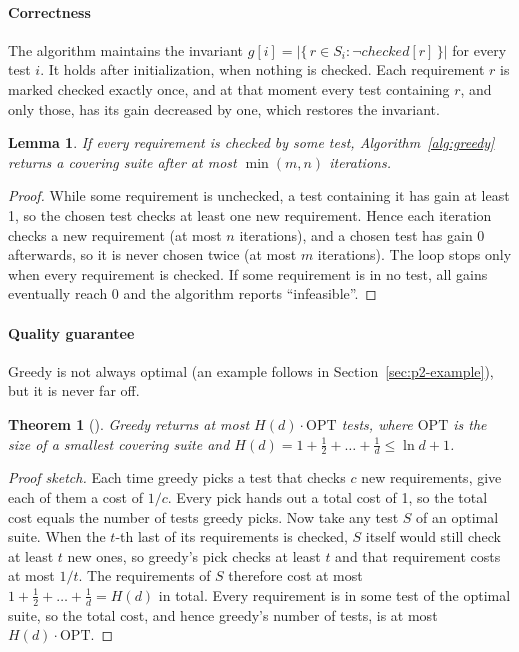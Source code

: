 \documentclass[conference]{IEEEtran}
\newtheorem{theorem}{Theorem}
\newtheorem{lemma}{Lemma}
\theoremstyle{definition}
\theoremstyle{remark}
\begin{document}
\paragraph*{Correctness}
The algorithm maintains the invariant
$g[i] = |\{\, r \in S_i : \neg\mathit{checked}[r] \,\}|$ for every test $i$.
It holds after initialization, when nothing is checked. Each requirement $r$
is marked checked exactly once, and at that moment every test containing $r$,
and only those, has its gain decreased by one, which restores the invariant.

\begin{lemma}\label{lem:greedy-valid}
If every requirement is checked by some test, Algorithm~\ref{alg:greedy}
returns a covering suite after at most $\min(m, n)$ iterations.
\end{lemma}
\begin{proof}
While some requirement is unchecked, a test containing it has gain at least
1, so the chosen test checks at least one new requirement. Hence each
iteration checks a new requirement (at most $n$ iterations), and a chosen test
has gain 0 afterwards, so it is never chosen twice (at most $m$ iterations).
The loop stops only when every requirement is checked. If some requirement is
in no test, all gains eventually reach 0 and the algorithm reports
``infeasible''.
\end{proof}

\paragraph*{Quality guarantee}
Greedy is not always optimal (an example follows in
Section~\ref{sec:p2-example}), but it is never far off.

\begin{theorem}[\cite{chvatal1979}]\label{thm:approx}
Greedy returns at most $H(d)\cdot\mathrm{OPT}$ tests, where $\mathrm{OPT}$ is
the size of a smallest covering suite and
$H(d) = 1 + \tfrac12 + \dots + \tfrac1d \le \ln d + 1$.
\end{theorem}
\begin{proof}[Proof sketch]
Each time greedy picks a test that checks $c$ new requirements, give each of
them a cost of $1/c$. Every pick hands out a total cost of 1, so the total
cost equals the number of tests greedy picks. Now take any test $S$ of an
optimal suite. When the $t$-th last of its requirements is checked, $S$
itself would still check at least $t$ new ones, so greedy's pick checks at
least $t$ and that requirement costs at most $1/t$. The requirements of $S$
therefore cost at most $1 + \tfrac12 + \dots + \tfrac1d = H(d)$ in total.
Every requirement is in some test of the optimal suite, so the total cost,
and hence greedy's number of tests, is at most $H(d)\cdot\mathrm{OPT}$.
\end{proof}
\end{document}
